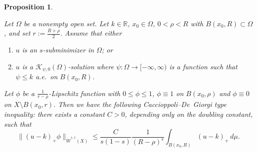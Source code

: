 \documentclass[11pt,leqno]{amsart}
\newtheorem{proposition}[theorem]{Proposition}
\numberwithin{equation}{section}
\theoremstyle{definition}
\begin{document}
	\begin{proposition}\label{lem2.2-13oct}
		
		
		Let $\Omega$ be a nonempty open set.
		Let $k\in\mathbb{R}$, $x_0\in \Omega$, $0<\rho<R$ with $B(x_0,R)\subset \Omega$, and set $r:=\frac{R+\rho}{2}$.
		Assume that either
		\begin{enumerate}
			\item \label{item-a}
			$u$ is an $s$-subminimizer 
			{in $\Omega$; or }
			\item \label{item-b}
			$u$ is a $\mathcal{K}_{\psi,0}(\Omega)$-solution where $\psi:\Omega\to[-\infty,\infty)$ is a function such that $\psi\leq k$
			a.e.\ on $B(x_0,R)$.
		\end{enumerate}
		Let $\phi$ be a $\frac{1}{r-\rho}$-Lipschitz function with $0\leq \phi\leq 1$, $\phi\equiv 1 $ on $B(x_0,\rho)$ and $\phi\equiv  0$ on $ X\setminus B(x_0,r)$.
		Then we have the following Caccioppoli--De~Giorgi type inequality:  
		there exists a constant $C>0$, depending only on the doubling constant, such that
		\begin{equation}\label{eq3.2-15mar}
			\|(u-k)_+\phi\|_{\dot W^{s,1}(X)}
			\leq 
			\frac{C}{s(1-s)}
			\frac{1}{(R-\rho)^s}
			\int_{B(x_0,R)} (u-k)_+\, d\mu.
		\end{equation}
		
	\end{proposition}
	
\end{document}
